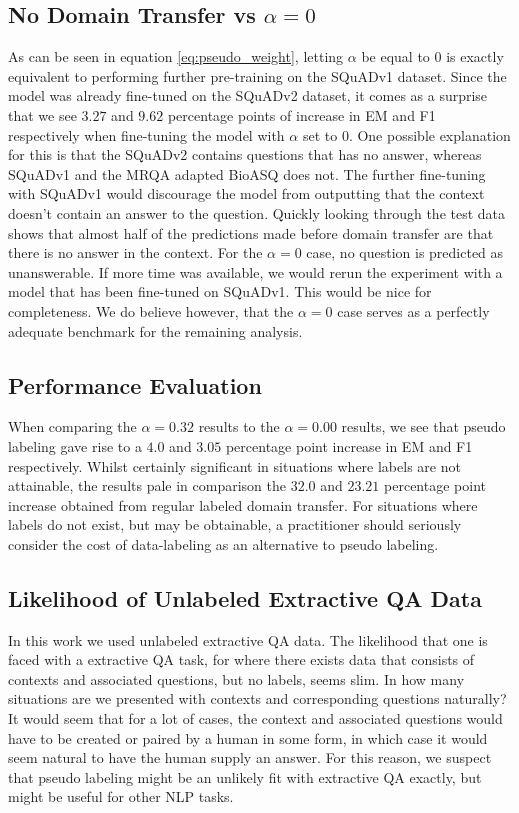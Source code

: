 \documentclass[twoside,twocolumn]{article}
\begin{document}
\subsection{No Domain Transfer vs $\alpha = 0$}
As can be seen in equation \ref{eq:pseudo_weight}, letting $\alpha$ be equal to $0$ is
exactly equivalent to performing further pre-training on the SQuADv1 dataset.
Since the model was already fine-tuned on the SQuADv2 dataset, it comes as a
surprise that we see $3.27$ and $9.62$ percentage points of increase in EM and
F1 respectively when fine-tuning the model with $\alpha$ set to $0$. One
possible explanation for this is that the SQuADv2 contains questions that has no
answer, whereas SQuADv1 and the MRQA adapted BioASQ does not. The further
fine-tuning with SQuADv1 would discourage the model from outputting that the
context doesn't contain an answer to the question. Quickly looking
through the test data shows that almost half of the predictions made before
domain transfer are that there is no answer in the context. For the $\alpha = 0$
case, no question is predicted as unanswerable. If more time was available, we
would rerun the experiment with a model that has been fine-tuned on SQuADv1.
This would be nice for completeness. We do believe however, that the $\alpha = 0$
case serves as a perfectly adequate benchmark for the remaining analysis. 


\subsection{Performance Evaluation}
When comparing the $\alpha = 0.32$ results to the $\alpha = 0.00$ results, we
see that pseudo labeling gave rise to a $4.0$ and $3.05$ percentage point increase
in EM and F1 respectively. Whilst certainly significant in situations where
labels are not attainable, the results pale in comparison the $32.0$ and
$23.21$ percentage point increase obtained from regular labeled domain transfer.
For situations where labels do not exist, but may be obtainable, a practitioner
should seriously consider the cost of data-labeling as an alternative to pseudo
labeling. 


\subsection{Likelihood of Unlabeled Extractive QA Data}
In this work we used unlabeled extractive QA data. The likelihood that one is faced with a
extractive QA task, for where there exists data that consists of contexts and associated
questions, but no labels, seems slim. In how many situations are we presented
with contexts and corresponding questions naturally? It would seem that for a
lot of cases, the context and associated questions  would have to be created or
paired by a human in some form, in which case it would seem natural to have the
human supply an answer. For this reason, we suspect that pseudo labeling might
be an unlikely fit with extractive QA exactly, but might be useful for other NLP tasks.
\end{document}
